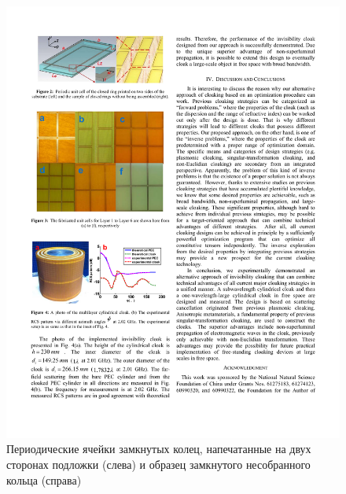 \documentclass[a4paper, 12pt]{article}
\begin{document}
\begin{figure}
\begin{centering}
\includegraphics[width=0.5\columnwidth,draft=false]{Fig_2}
\caption{\label{fig:cells} Периодические ячейки замкнутых колец, напечатанные
на двух сторонах подложки (слева) и образец замкнутого 
несобранного кольца (справа)}
\end{centering}
\end{figure}
\end{document}
